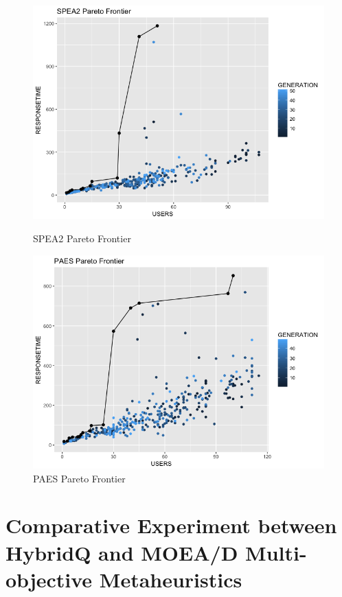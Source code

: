 \documentclass[espaco=umemeio,chapter=TITLE,twoside,openright]{abnt}
\begin{document}
\begin{figure}[h]
\begin{minipage}{.5\textwidth}
\centering
\includegraphics[width=1\textwidth]{./images/spea2noise.png}
\caption{SPEA2 Pareto Frontier}
\label{fig:spea2}
\end{minipage}
\begin{minipage}{.5\textwidth}
\centering
\includegraphics[width=1\textwidth]{./images/paesnoise.png}
\caption{PAES Pareto Frontier}
\label{fig:paes}
\end{minipage}
\end{figure}


\section{Comparative Experiment between HybridQ and MOEA/D Multi-objective Metaheuristics}
\end{document}
